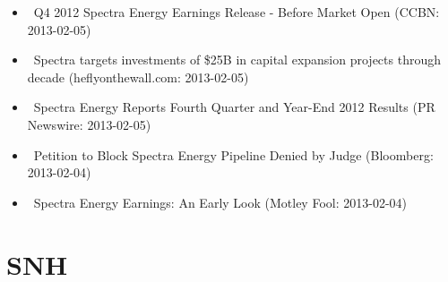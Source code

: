 \documentclass[11pt,asymmetric]{article}
\begin{document}
\begin{itemize}
\item\ Q4 2012 Spectra Energy Earnings Release - Before Market Open (CCBN: 2013-02-05)
\item\ Spectra targets investments of \$25B in capital expansion projects through decade (heflyonthewall.com: 2013-02-05)
\item\ Spectra Energy Reports Fourth Quarter and Year-End 2012 Results (PR Newswire: 2013-02-05)
\item\ Petition to Block Spectra Energy Pipeline Denied by Judge (Bloomberg: 2013-02-04)
\item\ Spectra Energy Earnings: An Early Look (Motley Fool: 2013-02-04)
\end{itemize}

\section*{SNH}
\end{document}
